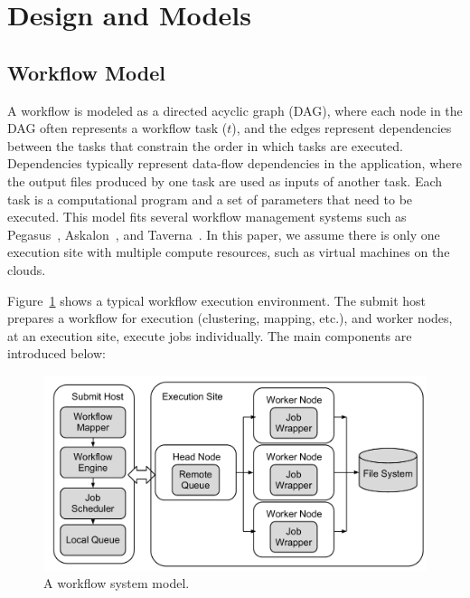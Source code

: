 \documentclass{IOS-Book-Article}
\begin{document}
\section{Design and Models}
\label{sec:models}



\subsection{Workflow Model}


\label{sec:model}


A workflow is modeled as a directed acyclic graph (DAG), where each node in the DAG often represents a workflow task ($t$), and the edges represent dependencies between the tasks that constrain the order in which tasks are executed. Dependencies typically represent data-flow dependencies in the application, where the output files produced by one task are used as inputs of another task. Each task is a computational program and a set of parameters that need to be executed. 
This model fits several workflow management systems such as Pegasus~\cite{Deelman2004}, Askalon~\cite{Fahringer2005}, and Taverna~\cite{Oinn2004}. In this paper, we assume there is only one execution site with multiple compute resources, such as virtual machines on the clouds. 


Figure~\ref{fig:model_system} shows a typical workflow execution environment. The submit host prepares a workflow for execution (clustering, mapping, etc.), and worker nodes, at an execution site, execute jobs individually. The main components are introduced below:

\begin{figure}[!htb]
\centering
  \includegraphics[width=0.95\linewidth]{figure1.pdf}
  \caption{A workflow system model.}
  \label{fig:model_system}
\end{figure}
\end{document}

